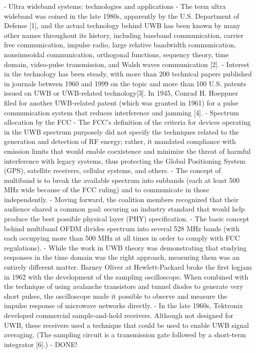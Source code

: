 \cite{aiello2006ultra}
	- Ultra wideband systems: technologies and applications
	- The term ultra wideband was coined in the late 1980s, apparently by the U.S. Department of Defense [1], and the actual technology behind UWB has been known by many other names throughout its history, including baseband communication, carrier free communication, impulse radio, large relative bandwidth communication, nonsinusoidal communication, orthogonal functions, sequency theory, time domain, video-pulse transmission, and Walsh waves communication [2].
	- Interest in the technology has been steady, with more than 200 technical papers published in journals between 1960 and 1999 on the topic and more than 100 U.S. patents issued on UWB or UWB-related technology[3].
	In 1945, Conrad H. Hoeppner filed for another UWB-related patent (which was granted in 1961) for a pulse communication system that reduces interference and jamming [4].
	- Spectrum allocation by the FCC
	- The FCC's definition of the criteria for devices operating in the UWB spectrum purposely did not specify the techniques related to the generation and detection of RF energy; rather, it mandated compliance with emission limits that would enable coexistence and minimize the threat of harmful interference with legacy systems, thus protecting the Global Positioning System (GPS), satellite receivers, cellular systems, and others.
	- The concept of multiband is to break the available spectrum into subbands (each at least 500 MHz wide because of the FCC ruling) and to communicate in those independently.
	- Moving forward, the coalition members recognized that their audience shared a common goal: securing an industry standard that would help produce the best possible physical layer (PHY) specification.
	- The basic concept behind multiband OFDM divides spectrum into several 528 MHz bands (with each occupying more than 500 MHz at all times in order to comply with FCC regulations).
	- While the work in UWB theory was demonstrating that studying responses in the time domain was the right approach, measuring them was an entirely different matter. Barney Oliver at Hewlett-Packard broke the first logjam in 1962 with the development of the sampling oscilloscope. When combined with the technique of using avalanche transistors and tunnel diodes to generate very short pulses, the oscilloscope made it possible to observe and measure the impulse response of microwave networks directly.
	- In the late 1960s, Tektronix developed commercial sample-and-hold receivers. Although not designed for UWB, these receivers used a technique that could be used to enable UWB signal averaging. (The sampling circuit is a transmission gate followed by a short-term integrator [6].)
	- DONE!
	
